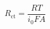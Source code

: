 \documentclass[preview]{standalone}
\begin{document}
\[R_\text{ct} = \frac{RT}{i_0 F A} \tag{2.13}\]
\end{document}
